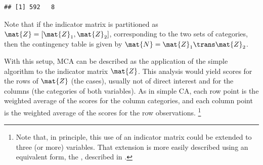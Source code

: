 \documentclass[11pt]{book}
\renewenvironment{knitrout}{\small\renewcommand{\baselinestretch}{.85}}{} %
\begin{document}
\begin{knitrout}
\color{fgcolor}\begin{kframe}
\begin{alltt}
 \hlkwb{<-} \hlstd{(haireye.df)[,}\hlopt{-}\hlstd{(}\hlopt{:}\hlstd{)]}
 \hlkwb{<-} \hlstd{(}\hlopt{$} \hlopt{$}
 \hlkwb{<-} 
\end{alltt}
\begin{verbatim}
## [1] 592   8
\end{verbatim}
\end{kframe}
\end{knitrout}
Note that if the indicator matrix is partitioned as
$\mat{Z} = [ \mat{Z}_1 , \mat{Z}_2 ]$, corresponding to the two sets of
categories, then the contingency table is given by
$\mat{N} = \mat{Z}_1 \trans \mat{Z}_2$.
\begin{knitrout}
\color{fgcolor}
\end{knitrout}
With this setup, MCA can be described as the application of the simple \ca
algorithm to the indicator matrix $\mat{Z}$.
This analysis would yield scores for the rows of $\mat{Z}$ (the cases),
usually not of direct interest
and for the columns (the categories of both variables).
As in simple CA, each row point is the weighted average of the scores
for the column categories, and each column point is the weighted average
of the scores for the row observations.%
\footnote{Note that, in principle, this use of an indicator matrix could be
extended to three (or more) variables.  That extension is more easily
described using an equivalent form, the , described
in .
}
\end{document}
